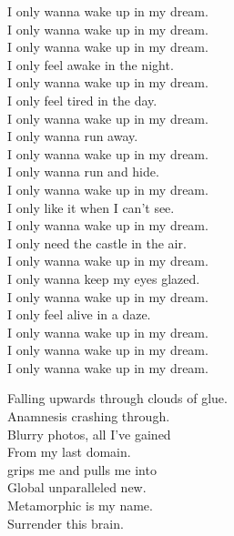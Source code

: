 I only wanna wake up in my dream. \\
I only wanna wake up in my dream. \\

I only wanna wake up in my dream. \\
I only feel awake in the night. \\
I only wanna wake up in my dream. \\
I only feel tired in the day. \\
I only wanna wake up in my dream. \\
I only wanna run away. \\
I only wanna wake up in my dream. \\
I only wanna run and hide. \\
I only wanna wake up in my dream. \\
I only like it when I can't see. \\
I only wanna wake up in my dream. \\
I only need the castle in the air. \\
I only wanna wake up in my dream. \\
I only wanna keep my eyes glazed. \\
I only wanna wake up in my dream. \\
I only feel alive in a daze. \\

I only wanna wake up in my dream. \\
I only wanna wake up in my dream. \\
I only wanna wake up in my dream. \\





Falling upwards through clouds of glue. \\
Anamnesis crashing through. \\
Blurry photos, all I've gained \\
From my last domain. \\

 grips me and pulls me into \\
Global unparalleled new. \\
Metamorphic is my name. \\
Surrender this brain. \\

